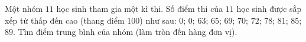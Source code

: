 \begin{ex}
Một nhóm $11$ học sinh tham gia một kì thi. Số điểm thi của $11$ học sinh được sắp xếp từ thấp đến cao (thang điểm $100$) như sau: $0$; $0$; $63$; $65$; $69$; $70$; $72$; $78$; $81$; $85$; $89$. Tìm điểm trung bình của nhóm (làm tròn đến hàng đơn vị).
\end{ex}
